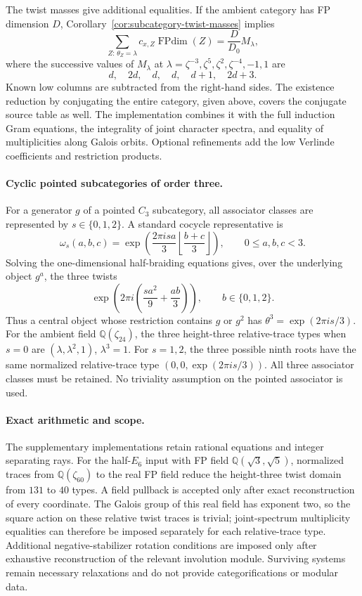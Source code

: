 The twist masses give additional equalities.  If the ambient category has
FP dimension $D$, Corollary~\ref{cor:subcategory-twist-masses} implies
\[
 \sum_{Z:\,\theta_Z=\lambda} c_{x,Z}\operatorname{FPdim}(Z)
       =\frac{D}{D_0}M_\lambda,
\]
where the successive values of $M_\lambda$ at
$\lambda=\zeta^{-3},\zeta^5,\zeta^2,\zeta^{-4},-1,1$
are
\[
 d,\quad 2d,\quad d,\quad d,\quad d+1,\quad 2d+3.
\]
Known low columns are subtracted from the right-hand sides.
The existence reduction by conjugating the entire category, given above,
covers the conjugate source table as well.  The implementation combines it with the full
induction Gram equations, the integrality of joint character spectra,
and equality of multiplicities along Galois orbits.  Optional refinements
add the low Verlinde coefficients and restriction products.

\paragraph{Cyclic pointed subcategories of order three.}
For a generator $g$ of a pointed $C_3$ subcategory, all associator classes
are represented by $s\in\{0,1,2\}$.  A standard cocycle representative is
\[
 \omega_s(a,b,c)=\exp\!\left(\frac{2\pi i s a}{3}
                         \left\lfloor\frac{b+c}{3}\right\rfloor\right),
 \qquad 0\le a,b,c<3.
\]
Solving the one-dimensional half-braiding equations gives, over the
underlying object $g^a$, the three twists
\[
 \exp\!\left(2\pi i\left(\frac{sa^2}{9}+\frac{ab}{3}\right)\right),
 \qquad b\in\{0,1,2\}.
\]
Thus a central object whose restriction contains $g$ or $g^2$ has
$\theta^3=\exp(2\pi i s/3)$.  For the ambient field
$\mathbb Q(\zeta_{24})$, the three height-three relative-trace types
when $s=0$ are $(\lambda,\lambda^2,1)$, $\lambda^3=1$.
For $s=1,2$, the three possible ninth roots have the same normalized
relative-trace type $(0,0,\exp(2\pi i s/3))$.
All three associator classes must be retained.  No triviality assumption
on the pointed associator is used.

\paragraph{Exact arithmetic and scope.}
The supplementary implementations retain rational equations and integer
separating rays.  For the half-$E_6$ input with FP field
$\mathbb Q(\sqrt3,\sqrt5)$, normalized traces from
$\mathbb Q(\zeta_{60})$ to the real FP field reduce the height-three
twist domain from $131$ to $40$ types.  A field pullback is accepted only
after exact reconstruction of every coordinate.  The Galois group of
this real field has exponent two, so the square action on these relative
twist traces is trivial; joint-spectrum multiplicity equalities can
therefore be imposed separately for each relative-trace type.
Additional negative-stabilizer rotation conditions are imposed only
after exhaustive reconstruction of the relevant involution module.
Surviving systems remain necessary relaxations and do not provide
categorifications or modular data.


